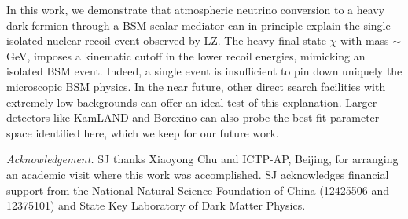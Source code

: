 \documentclass[prd,10pt,twocolumn,nofootinbib,preprint,superscriptaddress]{revtex4}
\begin{document}
In this work, we demonstrate that atmospheric neutrino conversion to a heavy dark fermion through a BSM scalar mediator can in principle explain the single isolated nuclear recoil event observed by LZ.
The heavy final state $\chi$ with mass $\sim$GeV, imposes a kinematic cutoff in the lower recoil energies, mimicking an isolated BSM event. 
Indeed, a single event is insufficient to pin down uniquely the microscopic BSM physics. 
In the near future, other direct search facilities with extremely low backgrounds can offer an ideal test of this explanation.
Larger detectors like KamLAND \cite{KamLAND:2021gvi} and Borexino \cite{BOREXINO:2021efb} can also probe the best-fit parameter space identified here, which we keep for our future work.

{\it Acknowledgement.} SJ thanks Xiaoyong Chu and ICTP-AP, Beijing, for arranging an academic visit where this work was accomplished.
SJ acknowledges financial support from the National Natural Science Foundation of China (12425506 and 12375101) and State Key Laboratory of Dark Matter Physics.



\end{document}
